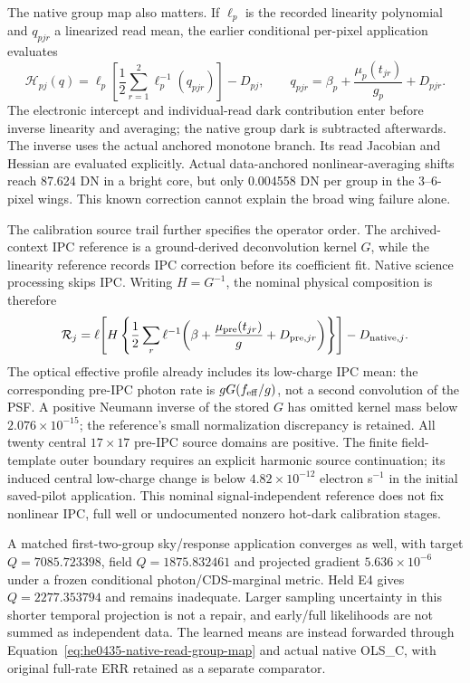 The native group map also matters. If $\ell_p$ is the recorded
linearity polynomial and $q_{pjr}$ a linearized read mean, the earlier
conditional per-pixel application evaluates
\begin{equation}
 \mathcal H_{pj}(q)=\ell_p\!\left[
       \frac12\sum_{r=1}^{2}\ell_p^{-1}(q_{pjr})\right]-D_{pj},
 \qquad q_{pjr}=\beta_p+\frac{\mu_p(t_{jr})}{g_p}+D_{pjr}.
 \label{eq:he0435-native-read-group-map}
\end{equation}
The electronic intercept and individual-read dark contribution enter
before inverse linearity and averaging; the native group dark is
subtracted afterwards. The inverse uses the actual anchored monotone
branch. Its read Jacobian and Hessian are evaluated explicitly.
Actual data-anchored nonlinear-averaging shifts reach 87.624 DN in a
bright core, but only 0.004558 DN per group in the 3--6-pixel wings.
This known correction cannot explain the broad wing failure alone.

The calibration source trail further specifies the operator order.
The archived-context IPC reference is a ground-derived deconvolution
kernel $G$, while the linearity reference records IPC correction
before its coefficient fit. Native science processing skips IPC.
Writing $H=G^{-1}$, the nominal physical composition is therefore
\begin{equation}
 \mathcal R_j=\ell\!\left[H\left\{
  \frac12\sum_r\ell^{-1}\!\left(\beta+
        \frac{\mu_{\rm pre}(t_{jr})}{g}+D_{{\rm pre},jr}\right)
                    \right\}\right]-D_{{\rm native},j}.
 \label{eq:he0435-calibration-ordered-ipc}
\end{equation}
The optical effective profile already includes its low-charge IPC
mean: the corresponding pre-IPC photon rate is $gG(f_{\rm eff}/g)$,
not a second convolution of the PSF. A positive Neumann inverse of
the stored $G$ has omitted kernel mass below $2.076\times10^{-15}$;
the reference's small normalization discrepancy is retained. All
twenty central $17\times17$ pre-IPC source domains are positive.
The finite field-template outer boundary requires an explicit
harmonic source continuation; its induced central low-charge change
is below $4.82\times10^{-12}$ electron s$^{-1}$ in the initial
saved-pilot application.
This nominal signal-independent reference does not fix nonlinear IPC,
full well or undocumented nonzero hot-dark calibration stages.

A matched first-two-group sky/response application converges as well,
with target $Q=7085.723398$, field $Q=1875.832461$ and projected gradient
$5.636\times10^{-6}$ under a frozen conditional photon/CDS-marginal
metric. Held E4 gives $Q=2277.353794$ and remains inadequate. Larger
sampling uncertainty in this shorter temporal projection is not a
repair, and early/full likelihoods are not summed as independent data.
The learned means are instead forwarded through
Equation~\eqref{eq:he0435-native-read-group-map} and actual native OLS\_C,
with original full-rate ERR retained as a separate comparator.

